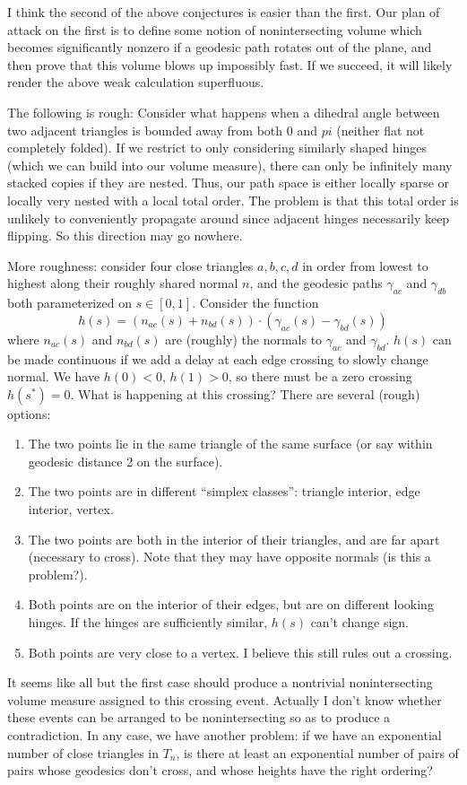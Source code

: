 \documentclass[11pt]{article}
\begin{document}
I think the second of the above conjectures is easier than the first.  Our plan of attack on the first is to
define some notion of nonintersecting volume which becomes significantly nonzero if a geodesic path rotates
out of the plane, and then prove that this volume blows up impossibly fast.  If we succeed, it will likely
render the above weak calculation superfluous.

The following is rough: Consider what happens when a dihedral angle between two adjacent triangles is bounded
away from both 0 and $pi$ (neither flat not completely folded).  If we restrict to only considering similarly
shaped hinges (which we can build into our volume measure), there can only be infinitely many stacked copies
if they are nested.  Thus, our path space is either locally sparse or locally very nested with a local total order.
The problem is that this total order is unlikely to conveniently propagate around since adjacent hinges necessarily
keep flipping.  So this direction may go nowhere.

More roughness: consider four close triangles $a,b,c,d$ in order from lowest to highest along their roughly
shared normal $n$, and the geodesic paths $\gamma_{ac}$ and $\gamma_{db}$ both parameterized on $s \in [0,1]$.
Consider the function
$$h(s) = (n_{ac}(s) + n_{bd}(s)) \cdot \left(\gamma_{ac}(s) - \gamma_{bd}(s)\right)$$
where $n_{ac}(s)$ and $n_{bd}(s)$ are (roughly) the normals to $\gamma_{ac}$ and $\gamma_{bd}$.  $h(s)$ can
be made continuous if we add a delay at each edge crossing to slowly change normal.
We have $h(0) < 0$, $h(1) > 0$, so there must be a zero crossing $h(s^*) = 0$.  What is happening at this
crossing?  There are several (rough) options:
\begin{enumerate}
\item The two points lie in the same triangle of the same surface (or say within geodesic distance 2 on the surface).
\item The two points are in different ``simplex classes'': triangle interior, edge interior, vertex.
\item The two points are both in the interior of their triangles, and are far apart (necessary to cross).
      Note that they may have opposite normals (is this a problem?).
\item Both points are on the interior of their edges, but are on different looking hinges.  If the hinges
      are sufficiently similar, $h(s)$ can't change sign.
\item Both points are very close to a vertex.  I believe this still rules out a crossing.
\end{enumerate}
It seems like all but the first case should produce a nontrivial nonintersecting volume measure assigned to
this crossing event.  Actually I don't know whether these events can be arranged to be nonintersecting so
as to produce a contradiction.  In any case, we have another problem: if we have an exponential number of
close triangles in $T_n$, is there at least an exponential number of pairs of pairs whose geodesics don't
cross, and whose heights have the right ordering?
\end{document}
